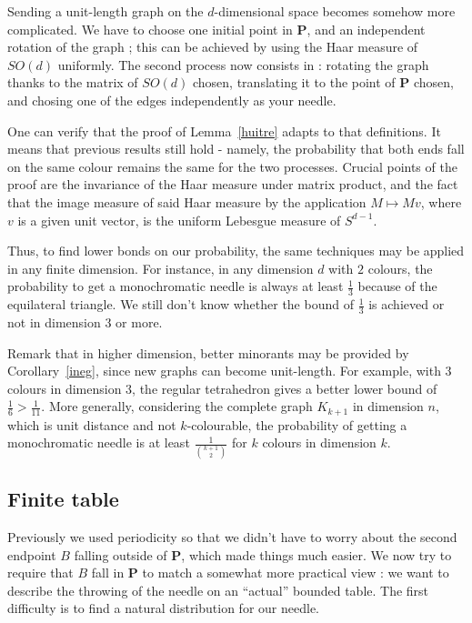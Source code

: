 \documentclass[a4paper,11pt]{article}
\theoremstyle{definition}
\theoremstyle{remark}
\begin{document}
Sending a unit-length graph on the $d$-dimensional space becomes somehow more 
complicated. We have to choose one initial point in $ \mathbf{P} $, and an independent 
rotation of the graph ; this can be achieved 
by using the Haar measure of $SO(d)$ uniformly. The second process now consists 
in : rotating the graph thanks to the matrix of $SO(d)$ chosen, translating it 
to the point of $\mathbf{P}$ chosen, and chosing one of the 
edges independently as your needle.

One can verify that the proof of Lemma~\ref{huitre} adapts to that definitions. 
It means that previous results still hold - namely, the probability that both 
ends fall on the same colour remains the same for the two processes. Crucial 
points of the proof are the invariance of the Haar measure under matrix product, and the 
fact that the image measure of said Haar measure by the application 
$M\mapsto Mv$, where $v$ is a given unit vector, is the uniform Lebesgue 
measure of $S^{d-1}$.

Thus, to find lower bonds on our probability, the same techniques may be applied 
in any finite dimension. For instance, in any dimension $d$ with $2$ colours,
the probability to get a monochromatic  
needle is always at least $\frac{1}{3}$ because of the equilateral triangle. 
We still don't know whether the bound of $\frac{1}{3}$ is achieved or not in 
dimension $3$ or more. 

Remark that in higher dimension, better minorants may be provided by 
Corollary~\ref{ineg}, since new graphs can 
become unit-length. For example, with $3$ colours in dimension $3$, the regular 
tetrahedron gives a better lower bound 
of $\frac 1 6 >\frac 1 {11}$. More generally, considering the complete graph 
$K_{k+1}$ in dimension $n$, which is unit distance and not $k$-colourable, the 
probability of getting a monochromatic needle is at least $\frac{1}{\binom{k+1}{2}}$ 
for $k$ colours in dimension $k$.

\subsection{Finite table}
\label{fini}

Previously we used periodicity so that we didn't have to worry about the second 
endpoint $B$ falling outside of $\mathbf{P}$, which made things much easier. We now 
try to require that $B$ fall in $\mathbf{P}$ to match a somewhat more practical 
view : we want to describe the throwing of the needle on an ``actual'' bounded 
table. The first difficulty is to find a natural distribution for our needle.
\end{document}
